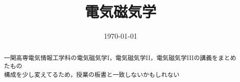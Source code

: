 

\title{電気磁気学}
\date{\today}



\maketitle
\pagestyle{fancy}

\begin{abstract}
一関高専電気情報工学科の電気磁気学I，電気磁気学II，電気磁気学IIIの講義をまとめたもの\\
構成を少し変えてるため，授業の板書と一致しないかもしれない
\end{abstract}


\newpage


\newpage


